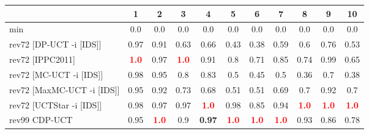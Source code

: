 \documentclass{article}
\begin{document}
\begin{tabular}{|l|r@{$\pm$}rr@{$\pm$}rr@{$\pm$}rr@{$\pm$}rr@{$\pm$}rr@{$\pm$}rr@{$\pm$}rr@{$\pm$}rr@{$\pm$}rr@{$\pm$}r|}
\hline

& \multicolumn{2}{c}{1}
& \multicolumn{2}{c}{2}
& \multicolumn{2}{c}{3}
& \multicolumn{2}{c}{4}
& \multicolumn{2}{c}{5}
& \multicolumn{2}{c}{6}
& \multicolumn{2}{c}{7}
& \multicolumn{2}{c}{8}
& \multicolumn{2}{c}{9}
& \multicolumn{2}{c|}{10}
\\
\hline
\hline
min
& \multicolumn{2}{c}{0.0}
& \multicolumn{2}{c}{0.0}
& \multicolumn{2}{c}{0.0}
& \multicolumn{2}{c}{0.0}
& \multicolumn{2}{c}{0.0}
& \multicolumn{2}{c}{0.0}
& \multicolumn{2}{c}{0.0}
& \multicolumn{2}{c}{0.0}
& \multicolumn{2}{c}{0.0}
& \multicolumn{2}{c|}{0.0}
\\
rev72 [DP-UCT -i [IDS]]
& \multicolumn{2}{c}{0.97}
& \multicolumn{2}{c}{0.91}
& \multicolumn{2}{c}{0.63}
& \multicolumn{2}{c}{0.66}
& \multicolumn{2}{c}{0.43}
& \multicolumn{2}{c}{0.38}
& \multicolumn{2}{c}{0.59}
& \multicolumn{2}{c}{0.6}
& \multicolumn{2}{c}{0.76}
& \multicolumn{2}{c|}{0.53}
\\
rev72 [IPPC2011]
& \multicolumn{2}{c}{\textbf{\textcolor{red}{1.0}}}
& \multicolumn{2}{c}{0.97}
& \multicolumn{2}{c}{\textbf{\textcolor{red}{1.0}}}
& \multicolumn{2}{c}{0.91}
& \multicolumn{2}{c}{0.8}
& \multicolumn{2}{c}{0.71}
& \multicolumn{2}{c}{0.85}
& \multicolumn{2}{c}{0.74}
& \multicolumn{2}{c}{0.99}
& \multicolumn{2}{c|}{0.65}
\\
rev72 [MC-UCT -i [IDS]]
& \multicolumn{2}{c}{0.98}
& \multicolumn{2}{c}{0.95}
& \multicolumn{2}{c}{0.8}
& \multicolumn{2}{c}{0.83}
& \multicolumn{2}{c}{0.5}
& \multicolumn{2}{c}{0.45}
& \multicolumn{2}{c}{0.5}
& \multicolumn{2}{c}{0.36}
& \multicolumn{2}{c}{0.7}
& \multicolumn{2}{c|}{0.38}
\\
rev72 [MaxMC-UCT -i [IDS]]
& \multicolumn{2}{c}{0.95}
& \multicolumn{2}{c}{0.92}
& \multicolumn{2}{c}{0.73}
& \multicolumn{2}{c}{0.68}
& \multicolumn{2}{c}{0.51}
& \multicolumn{2}{c}{0.51}
& \multicolumn{2}{c}{0.69}
& \multicolumn{2}{c}{0.7}
& \multicolumn{2}{c}{0.92}
& \multicolumn{2}{c|}{0.7}
\\
rev72 [UCTStar -i [IDS]]
& \multicolumn{2}{c}{0.98}
& \multicolumn{2}{c}{0.97}
& \multicolumn{2}{c}{0.97}
& \multicolumn{2}{c}{\textbf{\textcolor{red}{1.0}}}
& \multicolumn{2}{c}{0.98}
& \multicolumn{2}{c}{0.85}
& \multicolumn{2}{c}{0.94}
& \multicolumn{2}{c}{\textbf{\textcolor{red}{1.0}}}
& \multicolumn{2}{c}{\textbf{\textcolor{red}{1.0}}}
& \multicolumn{2}{c|}{\textbf{\textcolor{red}{1.0}}}
\\
\hline
rev99 CDP-UCT
& \multicolumn{2}{c}{0.95}
& \multicolumn{2}{c}{\textbf{\textcolor{red}{1.0}}}
& \multicolumn{2}{c}{0.9}
& \multicolumn{2}{c}{\textbf{0.97}}
& \multicolumn{2}{c}{\textbf{\textcolor{red}{1.0}}}
& \multicolumn{2}{c}{\textbf{\textcolor{red}{1.0}}}
& \multicolumn{2}{c}{\textbf{\textcolor{red}{1.0}}}
& \multicolumn{2}{c}{0.93}
& \multicolumn{2}{c}{0.86}
& \multicolumn{2}{c|}{0.78}
\\
\hline
\end{tabular}%
\end{document}
